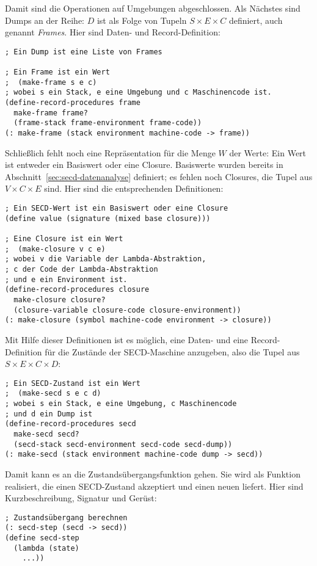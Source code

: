 %
Damit sind die Operationen auf Umgebungen abgeschlossen.  Als Nächstes
sind Dumps an der Reihe: $D$ ist als Folge von Tupeln $S\times E\times
C$ definiert, auch genannt \textit{Frames}.  Hier sind
Daten- und Record-Definition:
%
\begin{verbatim}
; Ein Dump ist eine Liste von Frames

; Ein Frame ist ein Wert
;  (make-frame s e c)
; wobei s ein Stack, e eine Umgebung und c Maschinencode ist.
(define-record-procedures frame
  make-frame frame?
  (frame-stack frame-environment frame-code))
(: make-frame (stack environment machine-code -> frame))
\end{verbatim}
%
Schließlich fehlt noch eine Repräsentation für die Menge $W$ der
Werte:  Ein Wert ist entweder ein Basiswert oder eine Closure.
Basiswerte wurden bereits in Abschnitt~\ref{sec:secd-datenanalyse}
definiert; es fehlen noch Closures, die Tupel aus $V\times C\times E$
sind.  Hier sind die entsprechenden Definitionen:
%
\begin{verbatim}
; Ein SECD-Wert ist ein Basiswert oder eine Closure
(define value (signature (mixed base closure)))

; Eine Closure ist ein Wert
;  (make-closure v c e)
; wobei v die Variable der Lambda-Abstraktion,
; c der Code der Lambda-Abstraktion
; und e ein Environment ist.
(define-record-procedures closure
  make-closure closure?
  (closure-variable closure-code closure-environment))
(: make-closure (symbol machine-code environment -> closure))
\end{verbatim}
%
Mit Hilfe dieser Definitionen ist es möglich, eine Daten- und eine
Record-Definition für die Zustände der SECD-Maschine anzugeben, also
die Tupel aus $S\times E\times C\times D$:
%
\begin{verbatim}
; Ein SECD-Zustand ist ein Wert
;  (make-secd s e c d)
; wobei s ein Stack, e eine Umgebung, c Maschinencode
; und d ein Dump ist
(define-record-procedures secd
  make-secd secd?
  (secd-stack secd-environment secd-code secd-dump))
(: make-secd (stack environment machine-code dump -> secd))
\end{verbatim}
%
Damit kann es an die Zustandsübergangsfunktion gehen.   Sie wird als
Funktion realisiert, die einen SECD-Zustand akzeptiert und einen neuen
liefert.  Hier sind Kurzbeschreibung, Signatur und Gerüst:
%
\begin{verbatim}
; Zustandsübergang berechnen
(: secd-step (secd -> secd))
(define secd-step
  (lambda (state)
    ...))
\end{verbatim}
